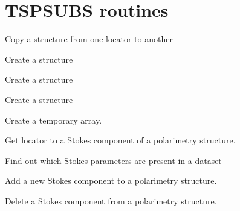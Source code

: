 \newpage
                                       
\section{TSPSUBS routines}

\begin{mansectionroutines}
     Copy a {} structure from one locator to another

     Create a {} {} structure

     Create a {} {} structure

     Create a {} {} structure

     Create a temporary array.

\end{mansectionroutines}
\begin{mansectionroutines}
     Get locator to a Stokes component of a polarimetry structure.

     Find out which Stokes parameters are present in a dataset

     Add a new Stokes component to a polarimetry structure.

     Delete a Stokes component from a polarimetry structure.

\end{mansectionroutines}
